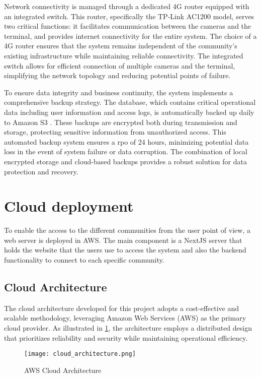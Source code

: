 Network connectivity is managed through a dedicated 4G router equipped with an integrated switch. This router, specifically the TP-Link AC1200 model, serves two critical functions: it facilitates communication between the cameras and the terminal, and provides internet connectivity for the entire system. The choice of a 4G router ensures that the system remains independent of the community's existing infrastructure while maintaining reliable connectivity. The integrated switch allows for efficient connection of multiple cameras and the terminal, simplifying the network topology and reducing potential points of failure.

To ensure data integrity and business continuity, the system implements a comprehensive backup strategy. The database, which contains critical operational data including user information and access logs, is automatically backed up daily to Amazon S3 \autocite{AmazonS3}. These backups are encrypted both during transmission and storage, protecting sensitive information from unauthorized access. This automated backup system ensures a \gls{rpo} of 24 hours, minimizing potential data loss in the event of system failure or data corruption. The combination of local encrypted storage and cloud-based backups provides a robust solution for data protection and recovery.

\section{Cloud deployment}

To enable the access to the different communities from the user point of view, a web server is deployed in AWS. The main component is a NextJS server that holds the website that the users use to access the system and also the backend functionality to connect to each specific community.

\subsection{Cloud Architecture}

The cloud architecture developed for this project adopts a cost-effective and scalable methodology, leveraging Amazon Web Services (AWS) as the primary cloud provider. As illustrated in \cref{fig:cloud_architecture}, the architecture employs a distributed design that prioritizes reliability and security while maintaining operational efficiency.

\begin{figure}
	\texttt{[image: cloud\_architecture.png]}
	\caption{AWS Cloud Architecture} \label{fig:cloud_architecture}
\end{figure}


